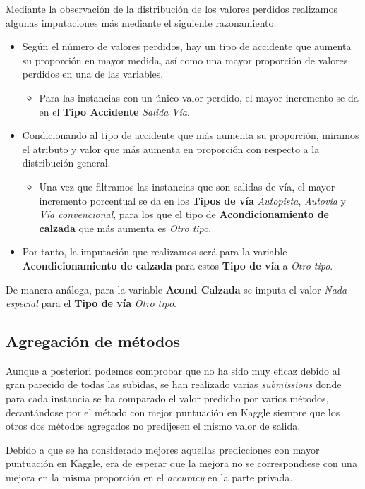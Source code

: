 \documentclass[11pt]{article}
\begin{document}
Mediante la observación de la distribución de los valores perdidos
realizamos algunas imputaciones más mediante el siguiente
razonamiento.
\begin{itemize}
\item Según el número de valores perdidos, hay un tipo de accidente que
aumenta su proporción en mayor medida, así como una mayor proporción
de valores perdidos en una de las variables. 
\begin{itemize}
\item Para las instancias con un único valor perdido, el mayor
incremento se da en el \textbf{Tipo Accidente} \emph{Salida Vía}.
\end{itemize}

\item Condicionando al tipo de accidente que más aumenta su proporción,
miramos el atributo y valor que más aumenta en proporción con
respecto a la distribución general.  
\begin{itemize}
\item Una vez que filtramos las instancias que son salidas de vía, el
mayor incremento porcentual se da en los \textbf{Tipos de vía} \emph{Autopista},
\emph{Autovía} y \emph{Vía convencional}, para los que el tipo de
\textbf{Acondicionamiento de calzada} que más aumenta es \emph{Otro tipo}.
\end{itemize}
\item Por tanto, la imputación que realizamos será para la variable
\textbf{Acondicionamiento de calzada} para estos \textbf{Tipo de vía} a \emph{Otro
tipo}.
\end{itemize}

De manera análoga, para la variable \textbf{Acond Calzada} se imputa el valor
\emph{Nada especial} para el \textbf{Tipo de vía} \emph{Otro tipo}. 

\subsection{Agregación de métodos}
\label{sec:org5032507}

Aunque a posteriori podemos comprobar que no ha sido muy eficaz debido
al gran parecido de todas las subidas, se han realizado varias
\emph{submissions} donde para cada instancia se ha comparado el valor
predicho por varios métodos, decantándose por el método con mejor
puntuación en Kaggle siempre que los otros dos métodos agregados no
predijesen el mismo valor de salida. 

Debido a que se ha considerado mejores aquellas predicciones con mayor
puntuación en Kaggle, era de esperar que la mejora no se
correspondiese con una mejora en la misma proporción en el \emph{accuracy}
en la parte privada.
\end{document}
